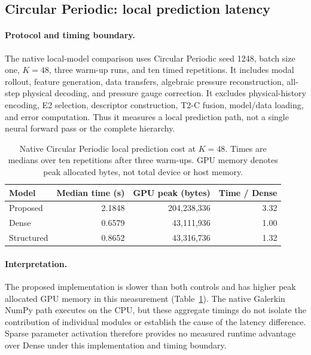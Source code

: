\subsection{Circular Periodic: local prediction latency}
\label{app:cost_local_latency}

\paragraph{Protocol and timing boundary.}
The native local-model comparison uses Circular Periodic seed 1248,
batch size one, $K=48$, three warm-up runs, and ten timed repetitions.
It includes modal rollout, feature generation, data transfers,
algebraic pressure reconstruction, all-step physical decoding, and
pressure gauge correction. It excludes physical-history encoding, E2
selection, descriptor construction, T2-C fusion, model/data loading,
and error computation. Thus it measures a local prediction path,
not a single neural forward pass or the complete hierarchy.

\begin{table}[tbp]
\centering\small
\caption{Native Circular Periodic local prediction cost at $K=48$.
Times are medians over ten repetitions after three warm-ups.
GPU memory denotes peak allocated bytes, not total device or host memory.}
\label{tab:local_latency}
\begin{tabular}{@{}lrrr@{}}
\toprule
Model & Median time (s) & GPU peak (bytes) & Time / Dense\\
\midrule
Proposed & 2.1848 & 204,238,336 & 3.32\\
Dense & 0.6579 & 43,111,936 & 1.00\\
Structured & 0.8652 & 43,316,736 & 1.32\\
\bottomrule
\end{tabular}
\end{table}

\paragraph{Interpretation.}
The proposed implementation is slower than both controls and has higher
peak allocated GPU memory in this measurement
(Table~\ref{tab:local_latency}). The native Galerkin NumPy path executes
on the CPU, but these aggregate timings do not isolate the contribution
of individual modules or establish the cause of the latency difference.
Sparse parameter activation therefore provides no measured runtime
advantage over Dense under this implementation and timing boundary.

